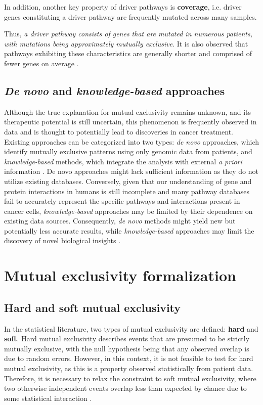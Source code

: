 In addition, another key property of driver pathways is \textbf{coverage}, i.e. driver genes constituting a driver pathway are frequently mutated across many samples.

Thus, \textit{a driver pathway consists of genes that are mutated in numerous patients, with mutations being approximately mutually exclusive}. It is also observed that pathways exhibiting these characteristics are generally shorter and comprised of fewer genes on average \cite{multi-dendrix}.

\subsection{\textit{De novo} and \textit{knowledge-based} approaches}

Although the true explanation for mutual exclusivity remains unknown, and its therapeutic potential is still uncertain, this phenomenon is frequently observed in data and is thought to potentially lead to discoveries in cancer treatment. Existing approaches can be categorized into two types: \textit{de novo} approaches, which identify mutually exclusive patterns using only genomic data from patients, and \textit{knowledge-based} methods, which integrate the analysis with external \textit{a priori} information \cite{survey}. De novo approaches might lack sufficient information as they do not utilize existing databases. Conversely, given that our understanding of gene and protein interactions in humans is still incomplete and many pathway databases fail to accurately represent the specific pathways and interactions present in cancer cells, \textit{knowledge-based} approaches may be limited by their dependence on existing data sources. Consequently, \textit{de novo} methods might yield new but potentially less accurate results, while \textit{knowledge-based} approaches may limit the discovery of novel biological insights \cite{multi-dendrix}.

\section{Mutual exclusivity formalization}

\subsection{Hard and soft mutual exclusivity}

In the statistical literature, two types of mutual exclusivity are defined: \textbf{hard} and \textbf{soft}. Hard mutual exclusivity describes events that are presumed to be strictly mutually exclusive, with the null hypothesis being that any observed overlap is due to random errors. However, in this context, it is not feasible to test for hard mutual exclusivity, as this is a property observed statistically from patient data. Therefore, it is necessary to relax the constraint to soft mutual exclusivity, where two otherwise independent events overlap less than expected by chance due to some statistical interaction \cite{mutex}.

